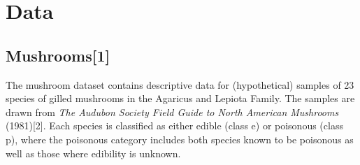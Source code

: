 \documentclass[11pt]{article}
\begin{document}
    

    \hypertarget{data}{%
\section{Data}\label{data}}

    \hypertarget{mushrooms}{%
\subsection{Mushrooms[1]}\label{mushrooms}}

The mushroom dataset contains descriptive data for (hypothetical)
samples of 23 species of gilled mushrooms in the Agaricus and Lepiota
Family. The samples are drawn from \emph{The Audubon Society Field Guide
to North American Mushrooms} (1981)[2]. Each species is classified as
either edible (class e) or poisonous (class p), where the poisonous
category includes both species known to be poisonous as well as those where edibility is unknown.
\end{document}
